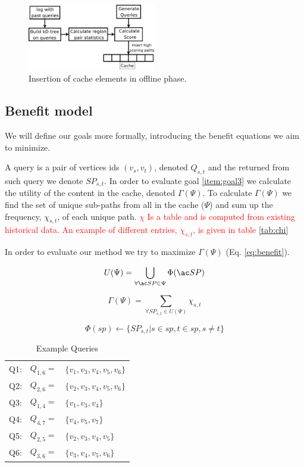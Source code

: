 \begin{figure}[bht]
  \center
        \includegraphics[width=0.5\textwidth]{figures/fillcache}
        \caption{Insertion of cache elements in offline phase.}
  \label{fig:fillcache}
\end{figure}


\subsection{Benefit model}

We will define our goals more formally, introducing the benefit equations we aim to minimize.

A query is a pair of vertices ids $(v_s, v_t)$, denoted $Q_{s,t}$ and the \spath returned from such query we denote $SP_{s,t}$. 
In order to evaluate goal \ref{item:goal3} we calculate the utility of the content in the cache, denoted $\Gamma(\Psi)$. To calculate $\Gamma(\Psi)$ we find the set of unique sub-paths from all \spaths in the cache ($\Psi$) and sum up the frequency, $\chi_{s,t}$, of each unique path.
\textcolor{red}{$\chi$ Is a table and is computed from existing historical data. An example of different entries, $\chi_{s,t}$, is given in table \ref{tab:chi}}

In order to evaluate our method we try to maximize $\Gamma(\Psi)$ (Eq. \ref{eq:benefit}).


\begin{equation} \label{eq:upsi}
 U(\Psi) = \bigcup\limits_{\forall \spath \in \Psi} \Phi(\spath)
\end{equation}

\begin{equation} \label{eq:benefit}
\Gamma(\Psi) = \sum\limits_{\forall SP_{s,t} \in U(\Psi)} \chi_{s,t}
\end{equation}

\begin{equation} \label{eq:phi}
\Phi(sp) \leftarrow \{ SP_{s,t} | s \in sp, t \in sp, s \neq t\}
\end{equation}


\begin{table}
\begin{tabular}{l l p{}}
Q1:	&	$Q_{1,6} =$ 	& $\{v_1,v_3,v_4,v_5,v_6\}$\\
Q2:	&	$Q_{2,6} =$ 	& $\{v_2,v_3,v_4,v_5,v_6\}$ \\
Q3:	&	$Q_{1,4} =$ 	& $\{v_1,v_3,v_4\}$ \\
Q4:	&	$Q_{4,7} =$ 	& $\{v_4,v_5,v_7\}$ \\
Q5:	&	$Q_{2,5} =$ 	& $\{v_2,v_3,v_4,v_5\}$ \\
Q6:	&	$Q_{3,6} =$ 	& $\{v_3,v_4,v_5,v_6\}$ \\
\end{tabular}
\caption{Example Queries}
\label{tab:queries}
\end{table}

